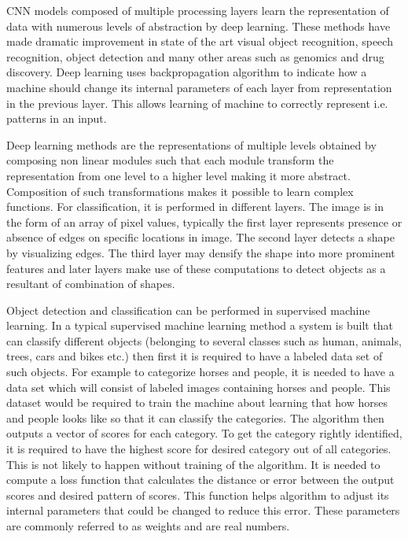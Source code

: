 \documentclass[11pt]{article}
\begin{document}
CNN models composed of multiple processing layers learn the representation of data with numerous levels of abstraction by deep learning. These methods have made dramatic improvement in state of the art visual object recognition, speech recognition, object detection and many other areas such as genomics and drug discovery. Deep learning uses backpropagation algorithm to indicate how a machine should change its internal parameters of each layer from representation in the previous layer. This allows learning of machine to correctly represent i.e. patterns in an input.

Deep learning methods are the representations of multiple levels obtained by composing non linear modules such that each module transform the representation from one level to a higher level making it more abstract. Composition of such transformations makes it possible to learn complex functions. For classification, it is performed in different layers. The image is in the form of an array of pixel values, typically the first layer represents presence or absence of edges on specific locations in image.  The second layer detects a shape by visualizing edges. The third layer may densify the shape into more prominent features and later layers make use of these computations to detect objects as a resultant of combination of shapes.

Object detection and classification can be performed in supervised machine learning. In a typical supervised machine learning method a system is built that can classify different objects (belonging to several classes such as human, animals, trees, cars and bikes etc.) then first it is required to have a labeled data set of such objects. For example to categorize horses and people, it is needed to have a data set which will consist of labeled images containing horses and people. This dataset would be required to train the machine about learning that how horses and people looks like so that it can classify the categories. The algorithm then outputs a vector of scores for each category. To get the category rightly identified, it is required to have the highest score for desired category out of all categories. This is not likely to happen without training of the algorithm. It is needed to compute a loss function that calculates the distance or error between the output scores and desired pattern of scores. This function helps algorithm to adjust its internal parameters that could be changed to reduce this error. These parameters are commonly referred to as weights and are real numbers.
\end{document}

